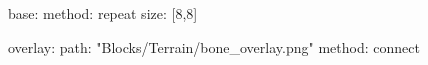base:
  method: repeat
  size: [8,8]

overlay:
  path: "Blocks/Terrain/bone_overlay.png"
  method: connect